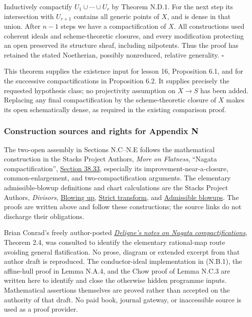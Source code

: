 \documentclass[11pt]{article}
\begin{document}
Inductively compactify \(U_1\cup\cdots\cup U_r\) by Theorem N.D.1. For
the next step its intersection with \(U_{r+1}\) contains all generic
points of \(X\), and is dense in that union. After \(n-1\) steps we have
a compactification of \(X\). All constructions used coherent ideals and
scheme-theoretic closures, and every modification protecting an open
preserved its structure sheaf, including nilpotents. Thus the proof has
retained the stated Noetherian, possibly nonreduced, relative
generality. \(\square\)

This theorem supplies the existence input for lesson 16, Proposition
6.1, and for the successive compactifications in Proposition 6.2. It
supplies precisely the requested hypothesis class; no projectivity
assumption on \(X\to S\) has been added. Replacing any final
compactification by the scheme-theoretic closure of \(X\) makes its open
schematically dense, as required in the existing comparison proof.

\subsubsection{Construction sources and rights for Appendix
N}\label{construction-sources-and-rights-for-appendix-n}

The two-open assembly in Sections N.C--N.E follows the mathematical
construction in the Stacks Project Authors, \emph{More on Flatness},
``Nagata compactification'',
\href{https://stacks.math.columbia.edu/tag/0F3T}{Section 38.33},
especially its improvement-near-a-closure, common-enlargement, and
two-compactification arguments. The elementary admissible-blowup
definitions and chart calculations are the Stacks Project Authors,
\emph{Divisors},
\href{https://stacks.math.columbia.edu/tag/01OF}{Blowing up},
\href{https://stacks.math.columbia.edu/tag/080C}{Strict transform}, and
\href{https://stacks.math.columbia.edu/tag/080J}{Admissible blowups}.
The proofs are written above and follow these constructions; the source
links do not discharge their obligations.

Brian Conrad's freely author-posted
\href{https://math.stanford.edu/~conrad/papers/nagatafinal.pdf}{\emph{Deligne's
notes on Nagata compactifications}}, Theorem 2.4, was consulted to
identify the elementary rational-map route avoiding general
flatification. No prose, diagram or extended excerpt from that author
draft is reproduced. The conductor-ideal implementation in (N.B.1), the
affine-hull proof in Lemma N.A.4, and the Chow proof of Lemma N.C.3 are
written here to identify and close the otherwise hidden programme
inputs. Mathematical assertions themselves are proved rather than
accepted on the authority of that draft. No paid book, journal gateway,
or inaccessible source is used as a proof provider.
\end{document}
